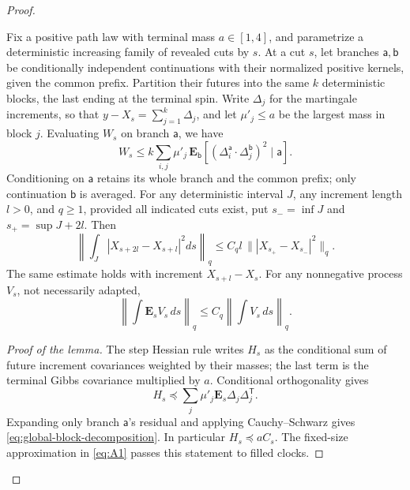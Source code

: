 \begin{proof}
\begin{lemma}
\label{global:residual-blocks}
Fix a positive path law with terminal mass \(a\in[1,4]\), and
parametrize a deterministic increasing family of revealed cuts by \(s\). At a cut \(s\), let branches \(\mathsf a,\mathsf b\)
be conditionally independent continuations with their normalized positive
kernels, given the common prefix. Partition their futures into the same
\(k\) deterministic blocks, the last ending at the terminal spin.
Write \(\Delta_j\) for the martingale increments, so that
\(y-X_s=\sum_{j=1}^k\Delta_j\), and let \(\mu'_j\le a\)
be the largest mass in block \(j\). Evaluating \(W_s\) on branch
\(\mathsf a\), we have
\begin{equation}
 W_s\le k\sum_{i,j}\mu'_j\,
    \mathbf E_{\mathsf b}[(\Delta_i^{\mathsf a}\cdot\Delta_j^{\mathsf b})^2\mid\mathsf a].
 \label{eq:global-block-decomposition}
\end{equation}
Conditioning on \(\mathsf a\) retains its whole branch and the common prefix;
only continuation \(\mathsf b\) is averaged. For any deterministic interval
\(J\), any increment length \(l>0\), and \(q\ge1\), provided all
indicated cuts exist, put \(s_-=\inf J\) and \(s_+=\sup J+2l\). Then
\begin{equation}
 \left\|\int_J|X_{s+2l}-X_{s+l}|^2ds\right\|_q
       \le C_q l\,\bigl\||X_{s_+}-X_{s_-}|^2\bigr\|_q .
 \label{eq:global-grid}
\end{equation}
The same estimate holds with increment \(X_{s+l}-X_s\).
For any nonnegative process \(V_s\), not necessarily adapted,
\begin{equation}
 \left\|\int\mathbf E_sV_s\,ds\right\|_q
       \le C_q\left\|\int V_s\,ds\right\|_q .
 \label{eq:global-dual-doob}
\end{equation}
\end{lemma}

\begin{proof}[Proof of the lemma]
The step Hessian rule writes \(H_s\) as the conditional sum of future
increment covariances weighted by their masses; the last term is the
terminal Gibbs covariance multiplied by \(a\). Conditional orthogonality
gives
\[
 H_s\preceq\sum_j\mu'_j\mathbf E_s
                 \Delta_j\Delta_j^{\mathsf T}.
\]
Expanding only branch \(\mathsf a\)'s residual and applying Cauchy--Schwarz
gives \eqref{eq:global-block-decomposition}. In particular
\(H_s\preceq aC_s\). The fixed-size approximation in
\eqref{eq:A1} passes this statement to filled clocks.


\end{proof}
\end{proof}

